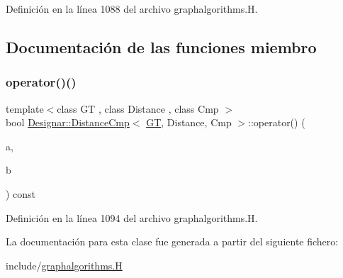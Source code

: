 Definición en la línea 1088 del archivo graphalgorithms.\+H.



\subsection{Documentación de las funciones miembro}
\mbox{\label{class_designar_1_1_distance_cmp_a5de92b27c64e3493d950a99018d28671}} 
\subsubsection{\texorpdfstring{operator()()}{operator()()}}
{\footnotesize\ttfamily template$<$class GT , class Distance , class Cmp $>$ \\
bool \hyperlink{class_designar_1_1_distance_cmp}{Designar\+::\+Distance\+Cmp}$<$ \hyperlink{demo-buildgraph_8_c_a3001c40d2c31ca87ed96cd7d1334a55e}{GT}, Distance, Cmp $>$\+::operator() (\begin{DoxyParamCaption}\item[{typename G\+T\+::\+Arc \&}]{a,  }\item[{typename G\+T\+::\+Arc \&}]{b }\end{DoxyParamCaption}) const\hspace{0.3cm}{\ttfamily [inline]}}



Definición en la línea 1094 del archivo graphalgorithms.\+H.



La documentación para esta clase fue generada a partir del siguiente fichero\+:\begin{DoxyCompactItemize}
\item 
include/\hyperlink{graphalgorithms_8_h}{graphalgorithms.\+H}\end{DoxyCompactItemize}
